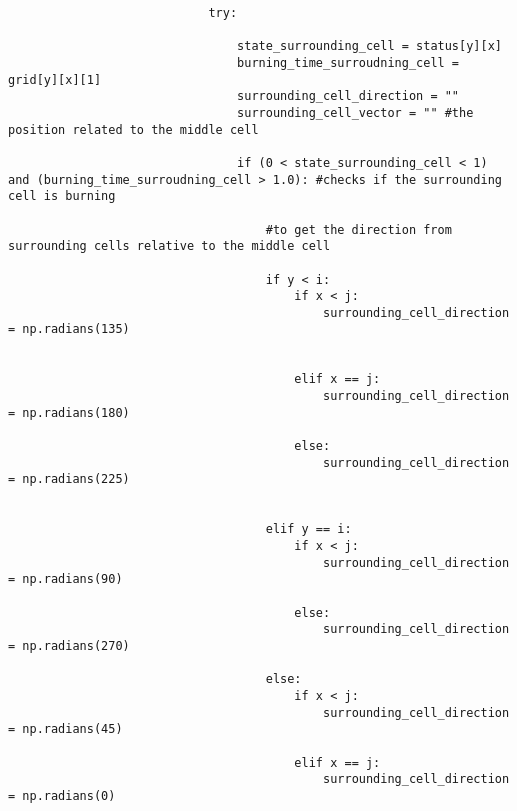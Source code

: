 \begin{lstlisting}
                            try:

                                state_surrounding_cell = status[y][x]
                                burning_time_surroudning_cell = grid[y][x][1]
                                surrounding_cell_direction = ""
                                surrounding_cell_vector = "" #the position related to the middle cell
                                                         
                                if (0 < state_surrounding_cell < 1) and (burning_time_surroudning_cell > 1.0): #checks if the surrounding cell is burning

                                    #to get the direction from surrounding cells relative to the middle cell

                                    if y < i:
                                        if x < j:
                                            surrounding_cell_direction = np.radians(135)
                                            
                                             
                                        elif x == j:
                                            surrounding_cell_direction = np.radians(180)
                                            
                                        else:
                                            surrounding_cell_direction = np.radians(225)
                                            
                                            
                                    elif y == i:
                                        if x < j:
                                            surrounding_cell_direction = np.radians(90)
                                            
                                        else:
                                            surrounding_cell_direction = np.radians(270)
                                            
                                    else:
                                        if x < j:
                                            surrounding_cell_direction = np.radians(45)
                                            
                                        elif x == j:
                                            surrounding_cell_direction = np.radians(0)
                                            

\end{lstlisting}
